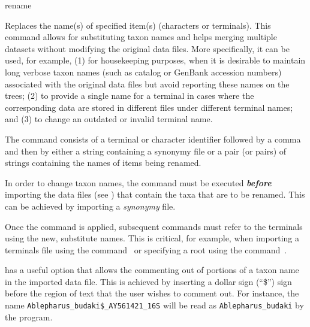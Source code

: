    
\begin{command}{rename}{}

	
	\begin{poydescription} 
        Replaces the name(s) of specified item(s) (characters or terminals). This command allows 
        for substituting taxon names and helps merging multiple datasets without modifying the original
        data files. More specifically, it can be used, for example, (1) for housekeeping purposes,
        when it is desirable to maintain long verbose taxon names (such as catalog or GenBank
        accession numbers) associated with the original data files but avoid reporting these 
        names on the trees; (2) to provide a single name for a terminal in cases where the corresponding
        data are stored in different files under different terminal names; and (3) to change an
        outdated or invalid terminal name.
        
        The command consists of a terminal or character identifier followed by a comma and then by
        either a string containing a synonymy file or a pair (or pairs) of strings containing the names of
        items being renamed.
	\end{poydescription}  
	      
	\begin{statement}
        In order to change taxon names, the command  must be
        executed {\bf \emph{before}} importing the data files (see  )
        that contain the taxa that are to be renamed.  This can be achieved by importing a 
        \emph{synonymy} file.
    \end{statement}
          
    \begin{statement}
        Once the command  is applied, subsequent commands 
        must refer to the terminals using the new, substitute names. This is critical, for example,
        when importing a terminals file using the command~ or specifying
        a root using the command~.
    \end{statement}
          
    \begin{statement}
          \poy has a useful option that allows the commenting out of portions of a taxon name in the imported
          data file. This is achieved by inserting a dollar sign (``\$'') sign before the region of text that the user wishes to comment 
          out.  For instance, the name \texttt{Ablepharus\_budaki\$\_AY561421\_16S} will be read as 
          \texttt{Ablepharus\_budaki} by the program.
    \end{statement}
          

\end{command}
